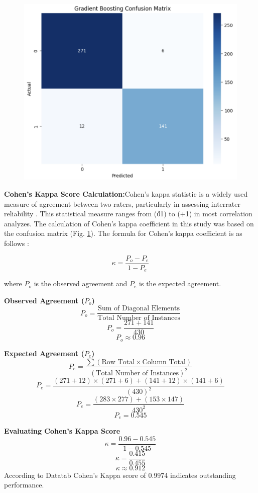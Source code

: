\documentclass[conference]{IEEEtran} %
\begin{document}
\begin{figure}[ht]
    \centering
    \includegraphics[width=\linewidth]{Fig-04.pdf}
    \caption{}
    \label{fig:confussion}
\end{figure}
\FloatBarrier


\textbf{Cohen's Kappa Score Calculation:}Cohen’s kappa statistic is a widely used measure of agreement between two raters, particularly in assessing interrater reliability \cite{ref7}. This statistical measure ranges from (ϑ1) to (+1) in most correlation analyzes. The calculation of Cohen’s kappa coefficient in this study was based on the confusion matrix (Fig. \ref{fig:confussion}). The formula for Cohen’s kappa coefficient is as follows \cite{ref8}:

\[
\kappa = \frac{P_o - P_e}{1 - P_e}
\]

where $P_o$ is the observed agreement and $P_e$ is the expected agreement.

\textbf{Observed Agreement ($P_o$)}
\[
P_o = \frac{\text{Sum of Diagonal Elements}}{\text{Total Number of Instances}}
\]
\[
P_o = \frac{271 + 141}{430}
\]
\[
P_o \approx 0.96
\]

\textbf{Expected Agreement ($P_e$)}
\[
P_e = \frac{\sum (\text{Row Total} \times \text{Column Total})}{(\text{Total Number of Instances})^2}
\]
\[
P_e = \frac{(271 + 12) \times (271 + 6) + (141 + 12) \times (141 + 6)}{(430)^2}
\]
\[
P_e = \frac{(283 \times 277) + (153\times 147)}{430^2}
\]
\[
P_e = 0.545
\]

\textbf{Evaluating Cohen's Kappa Score}
\[
\kappa = \frac{0.96 - 0.545}{1 - 0.545}
\]
\[
\kappa = \frac{0.415}{0.455}
\]
\[
\kappa \approx 0.912
\]
According to Datatab \cite{ref1} Cohen’s Kappa score of 0.9974 indicates outstanding performance.
\end{document}

